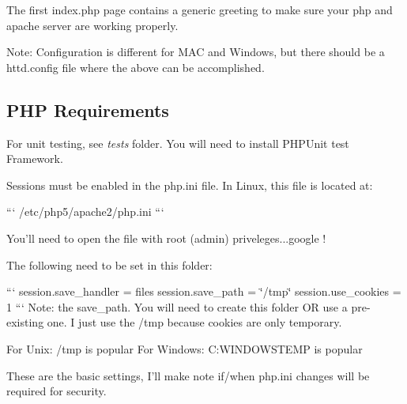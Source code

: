 The first index.\-php page contains a generic greeting to make sure your php and apache server are working properly.

Note\-: Configuration is different for M\-A\-C and Windows, but there should be a httd.\-config file where the above can be accomplished.

\subsection*{P\-H\-P Requirements}


\begin{DoxyEnumerate}
\item For unit testing, see {\itshape tests} folder. You will need to install P\-H\-P\-Unit test Framework.
\item Sessions must be enabled in the php.\-ini file. In Linux, this file is located at\-:

``` /etc/php5/apache2/php.ini ```

You'll need to open the file with root (admin) priveleges...google !

The following need to be set in this folder\-:

``` session.\-save\-\_\-handler = files session.\-save\-\_\-path = \char`\"{}/tmp\char`\"{} session.\-use\-\_\-cookies = 1 ``` Note\-: the save\-\_\-path. You will need to create this folder O\-R use a pre-\/ existing one. I just use the /tmp because cookies are only temporary.

For Unix\-: /tmp is popular For Windows\-: C\-:W\-I\-N\-D\-O\-W\-S\-T\-E\-M\-P is popular

These are the basic settings, I'll make note if/when php.\-ini changes will be required for security. 
\end{DoxyEnumerate}